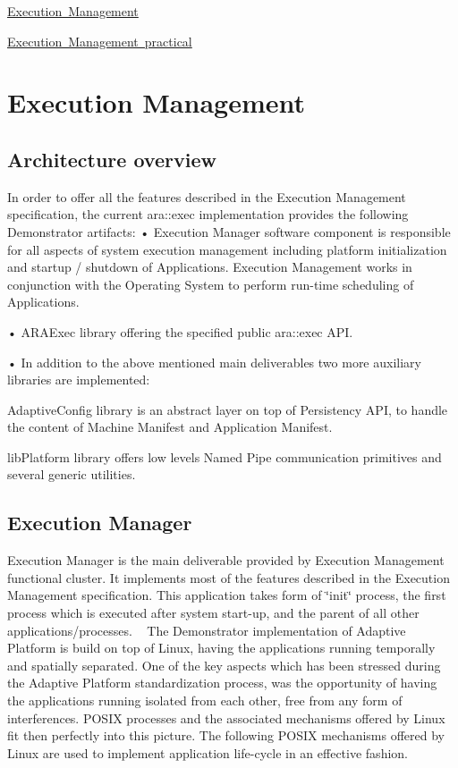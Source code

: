 
\begin{DoxyItemize}
\item \mbox{\hyperlink{Execution_Management}{Execution Management}}
\item \mbox{\hyperlink{Execution_practical}{Execution Management practical}} 
\end{DoxyItemize}\hypertarget{Execution_Management}{}\section{Execution Management}\label{Execution_Management}
\subsection*{Architecture overview}

In order to offer all the features described in the Execution Management specification, the current ara\+::exec implementation provides the following Demonstrator artifacts\+:  • Execution Manager software component is responsible for all aspects of system execution management including platform initialization and startup / shutdown of Applications. Execution Management works in conjunction with the Operating System to perform run-\/time scheduling of Applications.

• A\+R\+A\+Exec library offering the specified public ara\+::exec A\+PI.

• In addition to the above mentioned main deliverables two more auxiliary libraries are implemented\+:


\begin{DoxyItemize}
\item Adaptive\+Config library is an abstract layer on top of Persistency A\+PI, to handle the content of Machine Manifest and Application Manifest.
\item lib\+Platform library offers low levels Named Pipe communication primitives and several generic utilities.
\end{DoxyItemize}

\subsection*{Execution Manager}

Execution Manager is the main deliverable provided by Execution Management functional cluster. It implements most of the features described in the Execution Management specification. This application takes form of \char`\"{}init\char`\"{} process, the first process which is executed after system start-\/up, and the parent of all other applications/processes.  ~\newline
 The Demonstrator implementation of Adaptive Platform is build on top of Linux, having the applications running temporally and spatially separated. One of the key aspects which has been stressed during the Adaptive Platform standardization process, was the opportunity of having the applications running isolated from each other, free from any form of interferences. P\+O\+S\+IX processes and the associated mechanisms offered by Linux fit then perfectly into this picture. The following P\+O\+S\+IX mechanisms offered by Linux are used to implement application life-\/cycle in an effective fashion.


